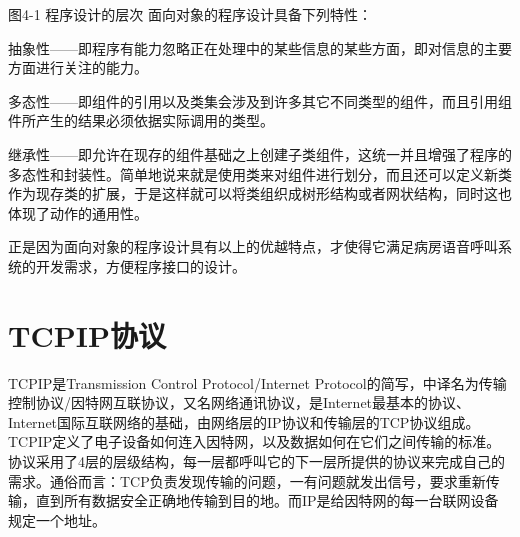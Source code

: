 图4-1	程序设计的层次
面向对象的程序设计具备下列特性：

抽{\cf}象性{\cf}——{\cf}即程{\cf}序有{\cf}能力{\cf}忽略{\cf}正在{\cf}处理{\cf}中的{\cf}某些{\cf}信息{\cf}的某{\cf}些方{\cf}面，{\cf}即对{\cf}信息{\cf}的主{\cf}要方{\cf}面进{\cf}行关{\cf}注的{\cf}能力。

多{\cf}态性{\cf}——{\cf}即组{\cf}件的{\cf}引用{\cf}以及{\cf}类集{\cf}会涉{\cf}及到{\cf}许多{\cf}其它{\cf}不同{\cf}类型{\cf}的组{\cf}件，{\cf}而且{\cf}引用{\cf}组件{\cf}所产{\cf}生的{\cf}结果{\cf}必须{\cf}依据{\cf}实际{\cf}调用{\cf}的类型。

继{\cf}承性{\cf}——{\cf}即允{\cf}许在{\cf}现存{\cf}的组{\cf}件基{\cf}础之{\cf}上创{\cf}建子{\cf}类组{\cf}件，{\cf}这统{\cf}一并{\cf}且增{\cf}强了{\cf}程序{\cf}的多{\cf}态性{\cf}和封{\cf}装性{\cf}。简{\cf}单地{\cf}说来{\cf}就是{\cf}使用{\cf}类来{\cf}对组{\cf}件进{\cf}行划{\cf}分，{\cf}而且{\cf}还可{\cf}以定{\cf}义新{\cf}类作{\cf}为现{\cf}存类{\cf}的扩{\cf}展，{\cf}于是{\cf}这样{\cf}就可{\cf}以将{\cf}类组{\cf}织成{\cf}树形{\cf}结构{\cf}或者{\cf}网状{\cf}结构{\cf}，同{\cf}时这{\cf}也体{\cf}现了{\cf}动作{\cf}的通{\cf}用性。

正是因为面向对象的程序设计具有以上的优越特点，才使得它满足病房语音呼叫系统的开发需求，方便程序接口的设计。

\section{\acrshort{TCPIP}协议}
\acrshort{TCPIP}是Transmission Control Protocol/Internet Protocol的简写，中{\cf}译名{\cf}为传{\cf}输控{\cf}制协{\cf}议/{\cf}因特{\cf}网互{\cf}联协{\cf}议，{\cf}又名{\cf}网络{\cf}通讯{\cf}协议{\cf}，是{\cf}In{\cf}te{\cf}rn{\cf}et{\cf}最基{\cf}本的{\cf}协议{\cf}、I{\cf}nt{\cf}er{\cf}ne{\cf}t国{\cf}际互{\cf}联网{\cf}络的{\cf}基础{\cf}，由{\cf}网络{\cf}层的{\cf}IP{\cf}协议{\cf}和传{\cf}输层{\cf}的T{\cf}CP{\cf}协议组成。\acrshort{TCPIP}定义了电子设备如何连入因特网，以及数据如何在它们之间传输的标准。协{\cf}议采{\cf}用了{\cf}4层{\cf}的层{\cf}级结{\cf}构，{\cf}每一{\cf}层都{\cf}呼叫{\cf}它的{\cf}下一{\cf}层所{\cf}提供{\cf}的协{\cf}议来{\cf}完成{\cf}自己{\cf}的需{\cf}求。{\cf}通俗{\cf}而言{\cf}：T{\cf}CP{\cf}负责{\cf}发现{\cf}传输{\cf}的问{\cf}题，{\cf}一有{\cf}问题{\cf}就发{\cf}出信{\cf}号，{\cf}要求{\cf}重新{\cf}传输{\cf}，直{\cf}到所{\cf}有数{\cf}据安{\cf}全正{\cf}确地{\cf}传输{\cf}到目{\cf}的地{\cf}。而{\cf}IP{\cf}是给{\cf}因特{\cf}网的{\cf}每一{\cf}台联{\cf}网设{\cf}备规{\cf}定一{\cf}个地址。

